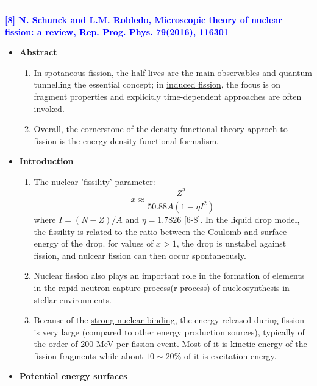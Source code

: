 \vspace{8pt}
\noindent\rule[0.25\baselineskip]{\textwidth}{2pt}
        \noindent \textcolor{blue}{\textbf{[8] N. Schunck and L.M. Robledo, Microscopic theory of nuclear fission: a review, Rep. Prog. Phys. 79(2016), 116301}}
\begin{itemize}[leftmargin=10pt]
    \item \textbf{Abstract}
        \begin{enumerate}[leftmargin=10pt]
            \item In \underline{spotaneous fission}, the half-lives are the main observables and quantum tunnelling the essential concept; in \underline{induced fission}, the focus is on fragment properties and explicitly time-dependent approaches are often invoked.
            \item Overall, the cornerstone of the density functional theory approch to fission is the energy density functional formalism.
        \end{enumerate}
    \item \textbf{Introduction}
        \begin{enumerate}[leftmargin=10pt]
            \item The nuclear 'fissility' parameter:
                \begin{equation}
                    x \approx \frac{Z^2}{50.88A(1-\eta I^2 )}
                \end{equation}
                where $I = (N - Z)/A$ and $\eta = 1.7826$ [6-8]. In the liquid drop model, the fissility is related to the ratio between the Coulomb and surface energy of the drop. for values of $x > 1$, the drop is unstabel against fission, and nulcear fission can then occur spontaneously.
            \item Nuclear fission also plays an important role in the formation of elements in the rapid neutron capture process(r-process) of nucleosynthesis in stellar environments.
            \item Because of the \underline{strong nuclear binding}, the energy released during fission is very large (compared to other energy production sources), typically of the order of 200 MeV per fission event. Most of it is kinetic energy of the fission fragments while about $10\sim 20\%$ of it is excitation energy. 
        \end{enumerate}
    \item \textbf{Potential energy surfaces} \newline

\end{itemize}
